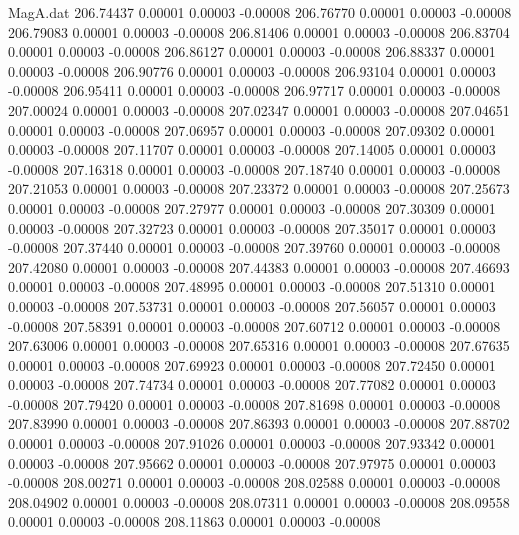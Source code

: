 \begin{filecontents}{MagA.dat}
 206.74437    0.00001    0.00003   -0.00008
 206.76770    0.00001    0.00003   -0.00008
 206.79083    0.00001    0.00003   -0.00008
 206.81406    0.00001    0.00003   -0.00008
 206.83704    0.00001    0.00003   -0.00008
 206.86127    0.00001    0.00003   -0.00008
 206.88337    0.00001    0.00003   -0.00008
 206.90776    0.00001    0.00003   -0.00008
 206.93104    0.00001    0.00003   -0.00008
 206.95411    0.00001    0.00003   -0.00008
 206.97717    0.00001    0.00003   -0.00008
 207.00024    0.00001    0.00003   -0.00008
 207.02347    0.00001    0.00003   -0.00008
 207.04651    0.00001    0.00003   -0.00008
 207.06957    0.00001    0.00003   -0.00008
 207.09302    0.00001    0.00003   -0.00008
 207.11707    0.00001    0.00003   -0.00008
 207.14005    0.00001    0.00003   -0.00008
 207.16318    0.00001    0.00003   -0.00008
 207.18740    0.00001    0.00003   -0.00008
 207.21053    0.00001    0.00003   -0.00008
 207.23372    0.00001    0.00003   -0.00008
 207.25673    0.00001    0.00003   -0.00008
 207.27977    0.00001    0.00003   -0.00008
 207.30309    0.00001    0.00003   -0.00008
 207.32723    0.00001    0.00003   -0.00008
 207.35017    0.00001    0.00003   -0.00008
 207.37440    0.00001    0.00003   -0.00008
 207.39760    0.00001    0.00003   -0.00008
 207.42080    0.00001    0.00003   -0.00008
 207.44383    0.00001    0.00003   -0.00008
 207.46693    0.00001    0.00003   -0.00008
 207.48995    0.00001    0.00003   -0.00008
 207.51310    0.00001    0.00003   -0.00008
 207.53731    0.00001    0.00003   -0.00008
 207.56057    0.00001    0.00003   -0.00008
 207.58391    0.00001    0.00003   -0.00008
 207.60712    0.00001    0.00003   -0.00008
 207.63006    0.00001    0.00003   -0.00008
 207.65316    0.00001    0.00003   -0.00008
 207.67635    0.00001    0.00003   -0.00008
 207.69923    0.00001    0.00003   -0.00008
 207.72450    0.00001    0.00003   -0.00008
 207.74734    0.00001    0.00003   -0.00008
 207.77082    0.00001    0.00003   -0.00008
 207.79420    0.00001    0.00003   -0.00008
 207.81698    0.00001    0.00003   -0.00008
 207.83990    0.00001    0.00003   -0.00008
 207.86393    0.00001    0.00003   -0.00008
 207.88702    0.00001    0.00003   -0.00008
 207.91026    0.00001    0.00003   -0.00008
 207.93342    0.00001    0.00003   -0.00008
 207.95662    0.00001    0.00003   -0.00008
 207.97975    0.00001    0.00003   -0.00008
 208.00271    0.00001    0.00003   -0.00008
 208.02588    0.00001    0.00003   -0.00008
 208.04902    0.00001    0.00003   -0.00008
 208.07311    0.00001    0.00003   -0.00008
 208.09558    0.00001    0.00003   -0.00008
 208.11863    0.00001    0.00003   -0.00008

\end{filecontents}
